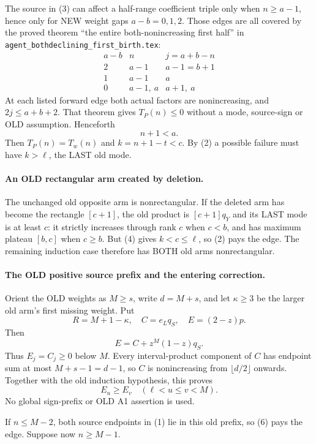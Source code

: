 The source in (3) can affect a half-range coefficient triple only when
$n\ge a-1$, hence only for NEW weight gaps $a-b=0,1,2$.
Those edges are all covered by the proved theorem ``the entire
both-nonincreasing first half'' in
\texttt{agent\_bothdeclining\_first\_birth.tex}:
\[
\begin{array}{c|c|c}
a-b&n&j=a+b-n\\\hline
2&a-1&a-1=b+1\\
1&a-1&a\\
0&a-1,\ a&a+1,\ a
\end{array}
\]
At each listed forward edge both actual factors are nonincreasing,
and $2j\le a+b+2$. That theorem gives $T_P(n)\le0$ without a mode,
source-sign or OLD assumption. Henceforth
\[
                              n+1<a.                   \tag{4}
\]
Then $T_P(n)=T_w(n)$ and $k=n+1-t<c$.
By (2) a possible failure must have $k>\ell$, the LAST old mode.

\paragraph{An OLD rectangular arm created by deletion.}
The unchanged old opposite arm is nonrectangular. If the deleted arm
has become the rectangle $[c+1]$, the old product is $[c+1]q_Y$ and
its LAST mode is at least $c$: it strictly increases through rank $c$
when $c<b$, and has maximum plateau $[b,c]$ when $c\ge b$.
But (4) gives $k<c\le\ell$, so (2) pays the edge.
The remaining induction case therefore has BOTH old arms nonrectangular.

\paragraph{The OLD positive source prefix and the entering correction.}
Orient the OLD weights as $M\ge s$, write $d=M+s$, and let
$\kappa\ge3$ be the larger old arm's first missing weight. Put
\[
 R=M+1-\kappa,\quad
 C=e_Lq_S,\quad E=(2-z)p.
\]
Then
\[
                         E=C+z^M(1-z)q_S.              \tag{5}
\]
Thus $E_j=C_j\ge0$ below $M$.
Every interval-product component of $C$ has endpoint sum at most
$M+s-1=d-1$, so $C$ is nonincreasing from $\lfloor d/2\rfloor$ onwards.
Together with the old induction hypothesis, this proves
\[
 E_u\ge E_v\quad(\ell<u\le v<M).                       \tag{6}
\]
No global sign-prefix or OLD A1 assertion is used.

If $n\le M-2$, both source endpoints in (1) lie in this old prefix,
so (6) pays the edge. Suppose now $n\ge M-1$.

